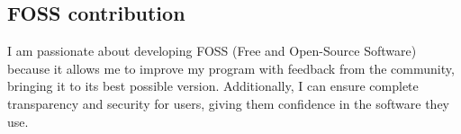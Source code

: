 \documentclass[12pt]{article}
\begin{document}
\subsection{FOSS contribution}
I am passionate about developing FOSS (Free and Open-Source Software) because it allows me to improve my program with feedback from the community, bringing it to its best possible version. Additionally, I can ensure complete transparency and security for users, giving them confidence in the software they use.
\pagebreak
\end{document}
